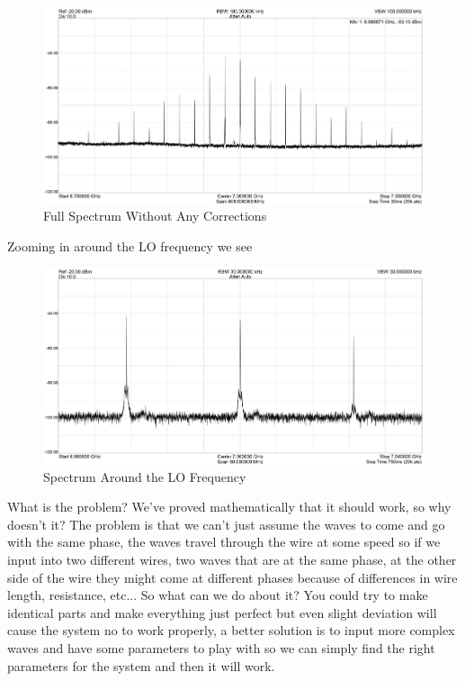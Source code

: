 \documentclass[english, a4paper, 12pt, twoside]{article}
\numberwithin{equation}{section} %
\begin{document}
\begin{figure}[H]
    \centering
    \includegraphics[width=0.8\columnwidth]{full-spectrum-no-correction.jpg} %
    \caption{Full Spectrum Without Any Corrections}
    \label{fig:Full-spectrum-no-corrections}
\end{figure}
Zooming in around the LO frequency we see
\begin{figure}[H]
    \centering
    \includegraphics[width=0.8\columnwidth]{Important-Spectrum-no-correction.jpg} %
    \caption{Spectrum Around the LO Frequency}
    \label{fig:closeup-spectrum-no-corrections}
\end{figure}

What is the problem? We've proved mathematically that it should work, so why doesn't it? The problem is that we can't just assume the waves to come and go with the same phase, the waves travel through the wire at some speed so if we input into two different wires, two waves that are at the same phase, at the other side of the wire they might come at different phases because of differences in wire length, resistance, etc... So what can we do about it? You could try to make identical parts and make everything just perfect but even slight deviation will cause the system no to work properly, a better solution is to input more complex waves and have some parameters to play with so we can simply find the right parameters for the system and then it will work.%
\end{document}
